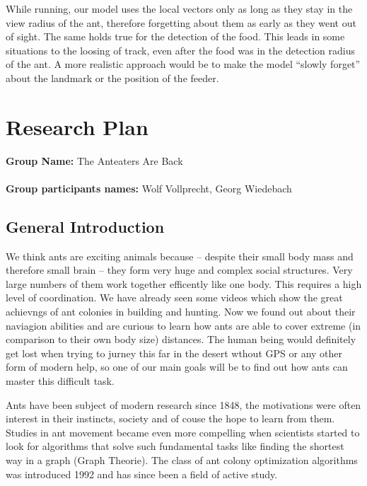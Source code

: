 \documentclass[11pt]{article}
\begin{document}
While running, our model uses the local vectors only as long as they stay in the view radius of the ant, therefore forgetting about them as early as they went out of sight. The same holds true for the detection of the food. This leads in some situations to the loosing of track, even after the food was in the detection radius of the ant. A more realistic approach would be to make the model “slowly forget” about the landmark or the position of the feeder.

\newpage
\appendix

\section{Research Plan}
\textbf{Group Name:} The Anteaters Are Back\\ \\
\textbf{Group participants names:} Wolf Vollprecht, Georg Wiedebach

\subsection{General Introduction}

We think ants are exciting animals because – despite their small body mass and therefore small brain – they form very huge and complex social structures. Very large numbers of them work together efficently like one body. This requires a high level of coordination. We have already seen some videos which show the great achievngs of ant colonies in building and hunting. Now we found out about their naviagion abilities and are curious to learn how ants are able to cover extreme (in comparison to their own body size) distances. The human being would definitely get lost when trying to jurney this far in the desert wthout GPS or any other form of modern help, so one of our main goals will be to find out how ants can master this difficult task.

Ants have been subject of modern research since 1848, the motivations were often interest in their instincts, society and of couse the hope to learn from them. Studies in ant movement became even more compelling when scientists started to look for algorithms that solve such fundamental tasks like finding the shortest way in a graph (Graph Theorie). The class of ant colony optimization algorithms was introduced 1992 and has since been a field of active study.
\end{document}
